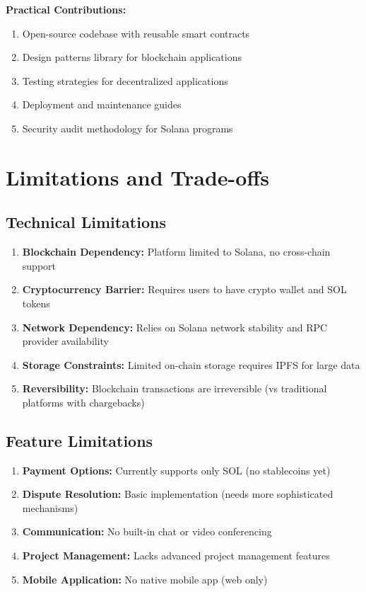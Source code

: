 \documentclass[a4paper,13pt,twoside]{report}
\theoremstyle{definition}
\begin{document}
\textbf{Practical Contributions:}
\begin{enumerate}
    \item Open-source codebase with reusable smart contracts
    \item Design patterns library for blockchain applications
    \item Testing strategies for decentralized applications
    \item Deployment and maintenance guides
    \item Security audit methodology for Solana programs
\end{enumerate}

\section{Limitations and Trade-offs}

\subsection{Technical Limitations}

\begin{enumerate}
    \item \textbf{Blockchain Dependency:} Platform limited to Solana, no cross-chain support
    \item \textbf{Cryptocurrency Barrier:} Requires users to have crypto wallet and SOL tokens
    \item \textbf{Network Dependency:} Relies on Solana network stability and RPC provider availability
    \item \textbf{Storage Constraints:} Limited on-chain storage requires IPFS for large data
    \item \textbf{Reversibility:} Blockchain transactions are irreversible (vs traditional platforms with chargebacks)
\end{enumerate}

\subsection{Feature Limitations}

\begin{enumerate}
    \item \textbf{Payment Options:} Currently supports only SOL (no stablecoins yet)
    \item \textbf{Dispute Resolution:} Basic implementation (needs more sophisticated mechanisms)
    \item \textbf{Communication:} No built-in chat or video conferencing
    \item \textbf{Project Management:} Lacks advanced project management features
    \item \textbf{Mobile Application:} No native mobile app (web only)
\end{enumerate}
\end{document}
